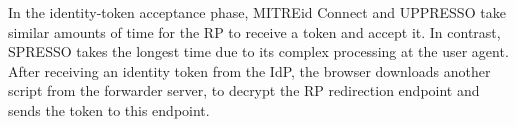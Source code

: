 In the identity-token acceptance phase, 
MITREid Connect and UPPRESSO take similar amounts of time for the RP to receive a token and accept it.
In contrast, SPRESSO takes the longest time due to its complex processing at the user agent.
After receiving an identity token from the IdP, the browser downloads another script from the forwarder server, to decrypt the RP redirection endpoint and sends the token to this endpoint.
